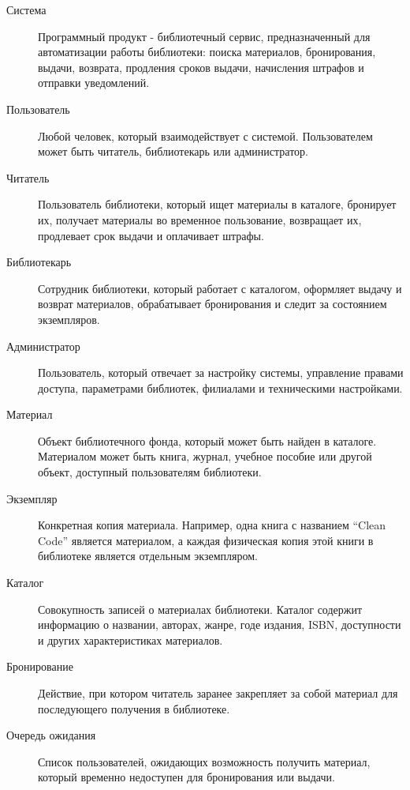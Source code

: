 \documentclass[12pt,a4paper]{article}
\begin{document}
	\begin{description}
		\item[Система] Программный продукт - библиотечный сервис, предназначенный для
		автоматизации работы библиотеки: поиска материалов, бронирования, выдачи,
		возврата, продления сроков выдачи, начисления штрафов и отправки уведомлений.
		
		\item[Пользователь] Любой человек, который взаимодействует с системой.
		Пользователем может быть читатель, библиотекарь или администратор.
		
		\item[Читатель] Пользователь библиотеки, который ищет материалы в каталоге,
		бронирует их, получает материалы во временное пользование, возвращает их,
		продлевает срок выдачи и оплачивает штрафы.
		
		\item[Библиотекарь] Сотрудник библиотеки, который работает с каталогом,
		оформляет выдачу и возврат материалов, обрабатывает бронирования и следит
		за состоянием экземпляров.
		
		\item[Администратор] Пользователь, который отвечает за настройку системы,
		управление правами доступа, параметрами библиотек, филиалами и техническими
		настройками.
		
		\item[Материал] Объект библиотечного фонда, который может быть найден в
		каталоге. Материалом может быть книга, журнал, учебное пособие или другой
		объект, доступный пользователям библиотеки.
		
		\item[Экземпляр] Конкретная копия материала. Например, одна книга с названием
		``Clean Code'' является материалом, а каждая физическая копия этой книги в
		библиотеке является отдельным экземпляром.
		
		\item[Каталог] Совокупность записей о материалах библиотеки. Каталог содержит
		информацию о названии, авторах, жанре, годе издания, ISBN, доступности и
		других характеристиках материалов.
		
		\item[Бронирование] Действие, при котором читатель заранее закрепляет за собой
		материал для последующего получения в библиотеке.
		
		\item[Очередь ожидания] Список пользователей, ожидающих возможность получить
		материал, который временно недоступен для бронирования или выдачи.
		

\end{description}
\end{document}

